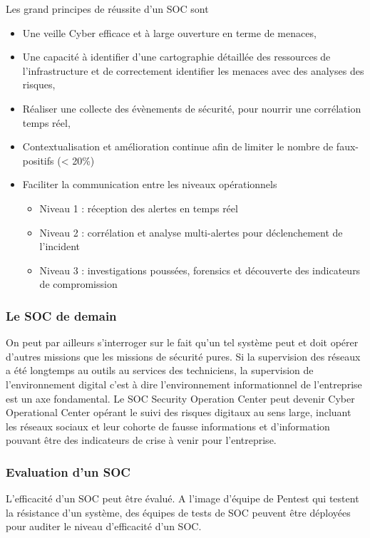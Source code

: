 Les grand principes de réussite d’un SOC sont 
\begin{itemize}
  \item Une veille Cyber efficace et à large ouverture en terme de menaces,
  \item Une capacité à identifier d’une cartographie détaillée des ressourcesde l’infrastructure et de correctement identifier les menaces avec des analyses des risques,
  \item Réaliser une collecte des évènements de sécurité, pour nourrir une corrélation temps réel,
  \item Contextualisation et amélioration continue afin delimiter le nombre de faux-positifs (< 20\%)
  \item Faciliter la communication entre les niveaux opérationnels
		\begin{itemize}
  				\item Niveau 1 : réception des alertes en temps réel
				\item Niveau 2 : corrélation et analyse multi-alertes pour déclenchement de l’incident
				\item Niveau 3 : investigations poussées, forensics et découverte des indicateurs de compromission
			\end{itemize}
\end{itemize}


\subsubsection{Le SOC de demain}
On peut par ailleurs s'interroger sur le fait qu'un tel système peut et doit opérer d'autres missions que les missions de sécurité pures. Si la supervision des réseaux a été longtemps au outils au services des techniciens, la supervision de l'environnement digital c'est à dire l'environnement informationnel de l'entreprise est un axe fondamental. Le SOC Security Operation Center peut devenir Cyber Operational Center opérant le suivi des risques digitaux au sens large, incluant les réseaux sociaux et leur cohorte de fausse informations et d'information pouvant être des indicateurs de crise à venir pour l'entreprise.

\subsubsection{Evaluation d'un SOC}

L'efficacité d'un SOC peut être évalué. A l'image d'équipe de Pentest qui testent la résistance d'un système, des équipes de tests de SOC peuvent être déployées pour auditer le niveau d'efficacité d'un SOC.

